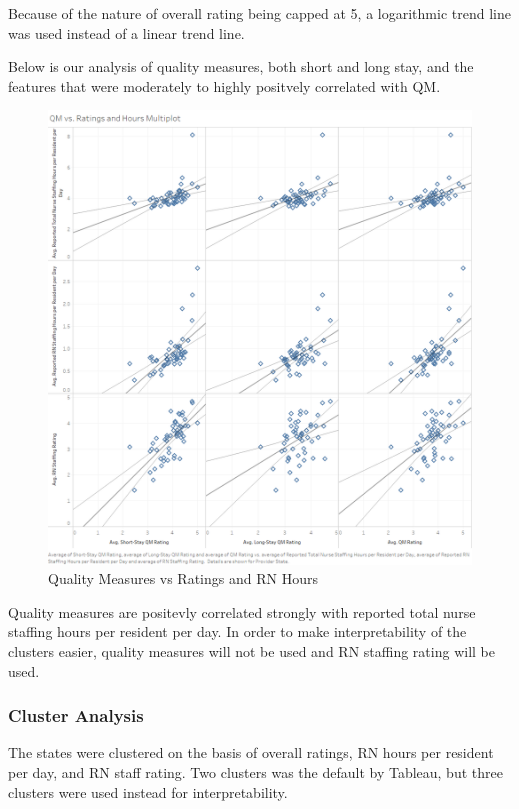 \documentclass{article}
\theoremstyle{mytheoremstyle}
\theoremstyle{mytheoremstyle}
\theoremstyle{myproblemstyle}
\begin{document}
\noindent Because of the nature of overall rating being capped at 5, a logarithmic trend line was used instead of a linear trend line.


\pagebreak
Below is our analysis of quality measures, both short and long stay, and the features that were moderately to highly positvely correlated with QM. 
\begin{figure}[htbp]
\centering
\includegraphics[width=\linewidth]{Images/QM vs. Ratings and Hours Multiplot.png}
\caption{Quality Measures vs Ratings and RN Hours}
\label{fig:provEDA}
\end{figure}

\noindent Quality measures are positevly correlated strongly with reported total nurse staffing hours per resident per day. In order to make interpretability of the clusters easier, quality measures will not be used and RN staffing rating will be used.  

\pagebreak
\subsubsection{Cluster Analysis}
The states were clustered on the basis of overall ratings, RN hours per resident per day, and RN staff rating. Two clusters was the default by Tableau, but three clusters were used instead for interpretability.
\end{document}
